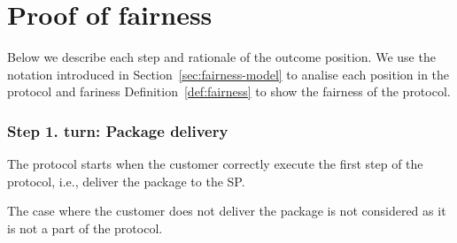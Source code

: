 \documentclass{ieeeaccess}
\begin{document}
\appendices

\section{Proof of fairness}\label{app:proof-of-fairness}
Below we describe each step and rationale of the outcome position.
We use the notation introduced in Section~\ref{sec:fairness-model} to analise each position in the protocol and fariness Definition~\ref{def:fairness} to show the fairness of the protocol.


\newcommand{\customer}{customer}
\renewcommand{\sp}{SP}
\newcommand{\AgreeablePath}{Agreeable path:}
\newcommand{\DisputePath}{The customer starts a dispute:}
\newcommand{\Fairness}{Fairness:}
\newcommand{\CustomerTurn}[0]{\expandafter\MakeUppercase customer turn:}
\newcommand{\SPTurn}[0]{\sp{} turn:}

\newcommand{\CanFollowToOne}[2]{The #1 can follow the protocol to the non-disadvantaged position #2}
\newcommand{\CanDoNothing}[1]{The #1 can do nothing and always end up in the non-disadvantaged position}
\newcommand{\CanDoAnything}[1]{The #1 can do anything and always end up in the non-disadvantaged position}
\newcommand{\Pos}[4]{$\operatorname{\sigma_{#1, #2, #3} = #4}$}
\newcommand{\WinForTheSameReason}[1]{The #1 wins the dispute for the same reason}

\newcommand{\CustomerLosesBeforePayment}{The customer loses the dispute because the SP is not obligated to do anything until the transaction is paid}
\newcommand{\CustomerLosesBeforePoP}{The customer loses the dispute because the SP still can publish the PoP within the agreed timeframe}

\newcommand{\normal}{n}
\newcommand{\dispute}{d}
\newcommand{\abnormal}{\overline{n}}
\newcommand{\abdispute}{\overline{d}}

\newcommand{\PoD}{$\mathrm{PoD}$}
\newcommand{\PoP}{$\mathrm{PoP}$}

\newcommand{\RemainsIn}[2]{The #1 remains in the #2 position}

\subsubsection*{Step 1. \CustomerTurn{} Package delivery}\label{step-1-deliver-package}

The protocol starts when the customer correctly execute the first step of the protocol, i.e., deliver the package to the SP. 

The case where the customer does not deliver the package is not considered as it is not a part of the protocol.
\end{document}
